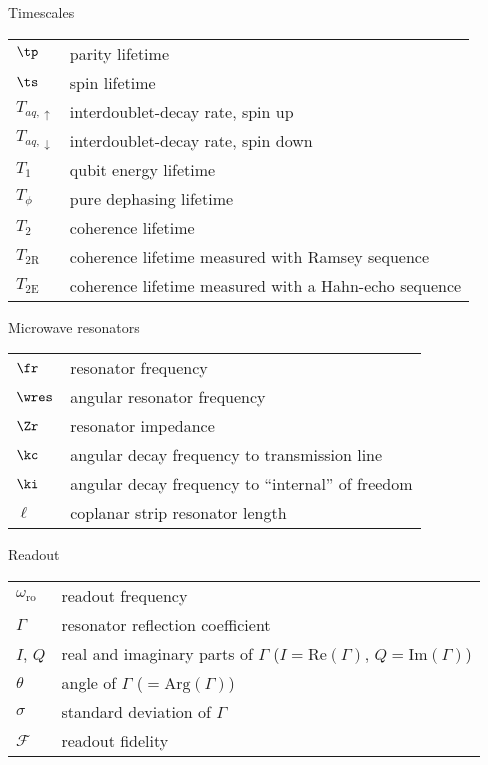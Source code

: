 {\Large\noindent Timescales}
\vspace{-.2cm}
\begin{longtable}{ m{5em} m{29em}}
$\tp$ & parity lifetime \\
$\ts$ & spin lifetime \\
$T_{aq,\uparrow}$ & interdoublet-decay rate, spin up \\
$T_{aq,\downarrow}$ & interdoublet-decay rate, spin down \\
$T_1$ & qubit energy lifetime \\
$T_\phi$ & pure dephasing lifetime \\
$T_{2}$ & coherence lifetime \\
$T_{2\mathrm{R}}$ & coherence lifetime measured with Ramsey sequence \\
$T_{2\mathrm{E}}$ & coherence lifetime measured with a Hahn-echo sequence \\
\end{longtable}
\vspace{.2cm}

{\Large\noindent Microwave resonators}
\vspace{-.2cm}
\begin{longtable}{ m{5em} m{29em}}
$\fr$ & resonator frequency \\
$\wres$ & angular resonator frequency \\
$\Zr$ & resonator impedance \\
$\kc$ & angular decay frequency to transmission line \\
$\ki$ & angular decay frequency to ``internal'' of freedom \\
$\ell$ & coplanar strip resonator length \\
\end{longtable}
\vspace{.2cm}

{\Large\noindent Readout}
\vspace{-.2cm}
\begin{longtable}{ m{5em} m{29em}}
$\omega_\mathrm{ro}$ & readout frequency \\
$\Gamma$ & resonator reflection coefficient \\
$I$, $Q$ & real and imaginary parts of $\Gamma$ ($I = \mathrm{Re}(\Gamma)$, $Q = \mathrm{Im}(\Gamma)$) \\
$\theta$ & angle of $\Gamma$ ($= \mathrm{Arg}(\Gamma)$) \\
$\sigma$ & standard deviation of $\Gamma$ \\
$\mathcal{F}$ & readout fidelity \\
\end{longtable}
\vspace{.2cm}

